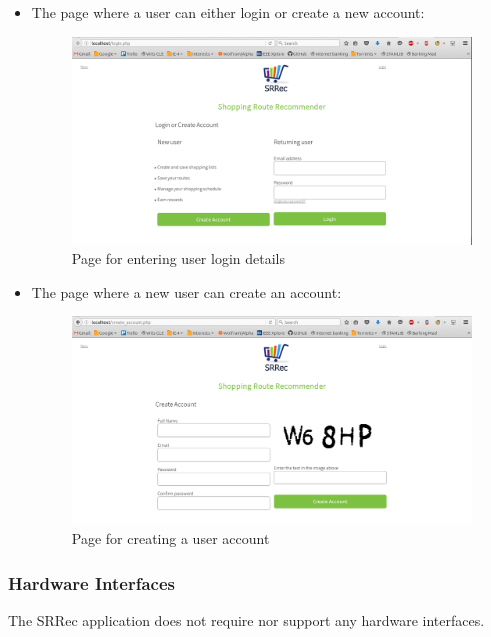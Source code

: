 \documentclass[10pt,twocolumn]{witseiepaper}
\begin{document}
\begin{itemize}
			\newpage
			\item The page where a user can either login or create a new account:
			\begin{figure}[h!]
				\centering
				\includegraphics[width = \columnwidth]{../images/login_new.png}
				\caption{Page for entering user login details}
				\label{login page}
			\end{figure}
			
			
			\item The page where a new user can create an account:
			\begin{figure}[h!]
				\centering
				\includegraphics[width = \columnwidth]{../images/create_account_new.png}
				\caption{Page for creating a user account}
				\label{create account page}
			\end{figure}
			
		\end{itemize}
		
		\subsubsection{Hardware Interfaces}
		
		The SRRec application does not require nor support any hardware interfaces.
		
\end{document}
